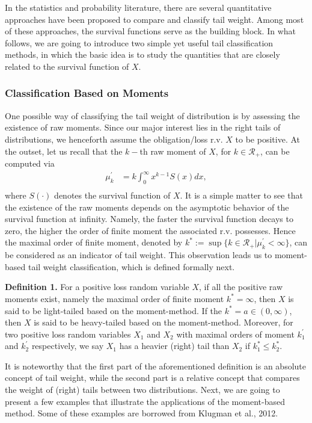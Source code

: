 \documentclass[]{book}
\theoremstyle{definition}
\theoremstyle{definition}
\theoremstyle{definition}
\theoremstyle{remark}
\begin{document}
In the statistics and probability literature, there are several
quantitative approaches have been proposed to compare and classify tail
weight. Among most of these approaches, the survival functions serve as
the building block. In what follows, we are going to introduce two
simple yet useful tail classification methods, in which the basic idea
is to study the quantities that are closely related to the survival
function of \(X\).

\subsubsection{Classification Based on
Moments}\label{classification-based-on-moments}

One possible way of classifying the tail weight of distribution is by
assessing the existence of raw moments. Since our major interest lies in
the right tails of distributions, we henceforth assume the
obligation/loss r.v. \(X\) to be positive. At the outset, let us recall
that the \(k-\)th raw moment of \(X\), for \(k\in\mathcal{R}_+\), can be
computed via \[\begin{aligned}
    \mu_k^{'} &= k \int_0^{\infty} x^{k-1} S(x) dx, \\
    \end{aligned}\] where \(S(\cdot)\) denotes the survival function of
\(X\). It is a simple matter to see that the existence of the raw
moments depends on the asymptotic behavior of the survival function at
infinity. Namely, the faster the survival function decays to zero, the
higher the order of finite moment the associated r.v. possesses. Hence
the maximal order of finite moment, denoted by
\(k^{\ast}:=\sup\{k\in \mathcal{R}_+|\mu_k^{'}<\infty \}\), can be
considered as an indicator of tail weight. This observation leads us to
moment-based tail weight classification, which is defined formally next.

\textbf{Definition 1.} For a positive loss random variable \(X\), if all
the positive raw moments exist, namely the maximal order of finite
moment \(k^{\ast}=\infty\), then \(X\) is said to be light-tailed based
on the moment-method. If the \(k^{\ast}=a \in (0,\infty)\), then \(X\)
is said to be heavy-tailed based on the moment-method. Moreover, for two
positive loss random variables \(X_1\) and \(X_2\) with maximal orders
of moment \(k^{'}_1\) and \(k^{'}_2\) respectively, we say \(X_1\) has a
heavier (right) tail than \(X_2\) if \(k^{\ast}_1\leq k^{\ast}_2\).

It is noteworthy that the first part of the aforementioned definition is
an absolute concept of tail weight, while the second part is a relative
concept that compares the weight of (right) tails between two
distributions. Next, we are going to present a few examples that
illustrate the applications of the moment-based method. Some of these
examples are borrowed from Klugman et al., 2012.
\end{document}
